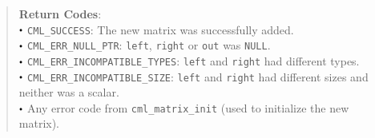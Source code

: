 \documentclass[a4paper,oneside,8pt]{extarticle}
\renewcommand{\dot}{\raisebox{0.3ex}{\scalebox{0.6}{$\bullet$}}}
\theoremstyle{definition}
\begin{document}
\begin{quote}
  \vspace{-0.75em}
  \textbf{Return Codes}: \\
  $\dot$ \texttt{CML\_SUCCESS}: The new matrix was successfully added. \\
  $\dot$ \texttt{CML\_ERR\_NULL\_PTR}: \texttt{left}, \texttt{right} or \texttt{out} was \texttt{NULL}. \\
  $\dot$ \texttt{CML\_ERR\_INCOMPATIBLE\_TYPES}: \texttt{left} and \texttt{right} had different types. \\
  $\dot$ \texttt{CML\_ERR\_INCOMPATIBLE\_SIZE}: \texttt{left} and \texttt{right} had different sizes and neither was a scalar. \\
  $\dot$ Any error code from \texttt{cml\_matrix\_init} (used to initialize the new matrix). \\
\end{quote}
\end{document}
